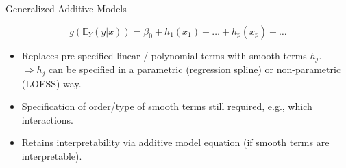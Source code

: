 \documentclass[11pt,compress,t,notes=noshow, aspectratio=169, xcolor=table]{beamer}
\begin{document}
\begin{frame}{Generalized Additive Models}

$$
g\left(\mathbb{E}_Y(y \vert x)\right) = \beta_0 + h_1(x_1) + \dots + h_p(x_p) + \dots
$$
\begin{itemize}
\item Replaces pre-specified linear / polynomial terms with smooth terms $h_j$.\\
$\Rightarrow h_j$ can be specified in a parametric (regression spline) or non-parametric (LOESS) way.
\item Specification of order/type of smooth terms still required, e.g., which interactions.
\item Retains interpretability via additive model equation (if smooth terms are interpretable).
\end{itemize}
\end{frame}
\end{document}
